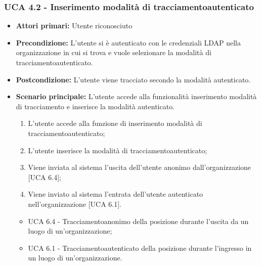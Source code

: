 \subsubsection{UCA 4.2 - Inserimento modalità di tracciamentoautenticato}%
\begin{itemize}
	\item \textbf{Attori primari:} Utente riconosciuto
	\item \textbf{Precondizione:} L'utente si è autenticato con le credenziali LDAP nella organizzazione in cui si trova e vuole selezionare la modalità di tracciamentoautenticato.
	\item \textbf{Postcondizione:} L'utente viene tracciato secondo la modalità autenticato.
	\item \textbf{Scenario principale:} L'utente accede alla funzionalità inserimento modalità di tracciamento e inserisce la modalità autenticato.
	\begin{enumerate}
		\item L'utente accede alla funzione di inserimento modalità di tracciamentoautenticato;
		\item L'utente inserisce la modalità di tracciamentoautenticato;
		\item Viene inviata al sistema l'uscita dell'utente anonimo dall'organizzazione [UCA 6.4];
		\item Viene inviato al sistema l'entrata dell'utente autenticato nell'organizzazione [UCA 6.1].
	\end{enumerate}
	\begin{itemize}
		\item UCA 6.4 - Tracciamentoanonimo della posizione durante l'uscita da un luogo di un'organizzazione;
		\item UCA 6.1 - Tracciamentoautenticato della posizione durante l'ingresso in un luogo di un'organizzazione.
	\end{itemize}
\end{itemize}
